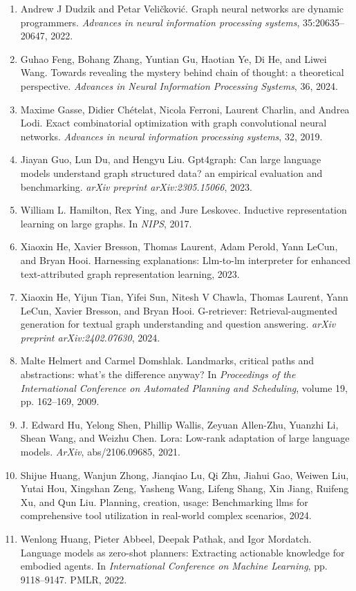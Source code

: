 \documentclass[11pt,UTF8,fontset=fandol]{ctexart}
\begin{document}
\begin{enumerate}[leftmargin=2em]
\item Andrew J Dudzik and Petar Veli\v{c}kovi\'c. Graph neural networks are dynamic programmers. \textit{Advances in neural information processing systems}, 35:20635--20647, 2022.
\item Guhao Feng, Bohang Zhang, Yuntian Gu, Haotian Ye, Di He, and Liwei Wang. Towards revealing the mystery behind chain of thought: a theoretical perspective. \textit{Advances in Neural Information Processing Systems}, 36, 2024.
\item Maxime Gasse, Didier Ch\'etelat, Nicola Ferroni, Laurent Charlin, and Andrea Lodi. Exact combinatorial optimization with graph convolutional neural networks. \textit{Advances in neural information processing systems}, 32, 2019.
\item Jiayan Guo, Lun Du, and Hengyu Liu. Gpt4graph: Can large language models understand graph structured data? an empirical evaluation and benchmarking. \textit{arXiv preprint arXiv:2305.15066}, 2023.
\item William L. Hamilton, Rex Ying, and Jure Leskovec. Inductive representation learning on large graphs. In \textit{NIPS}, 2017.
\item Xiaoxin He, Xavier Bresson, Thomas Laurent, Adam Perold, Yann LeCun, and Bryan Hooi. Harnessing explanations: Llm-to-lm interpreter for enhanced text-attributed graph representation learning, 2023.
\item Xiaoxin He, Yijun Tian, Yifei Sun, Nitesh V Chawla, Thomas Laurent, Yann LeCun, Xavier Bresson, and Bryan Hooi. G-retriever: Retrieval-augmented generation for textual graph understanding and question answering. \textit{arXiv preprint arXiv:2402.07630}, 2024.
\item Malte Helmert and Carmel Domshlak. Landmarks, critical paths and abstractions: what's the difference anyway? In \textit{Proceedings of the International Conference on Automated Planning and Scheduling}, volume 19, pp. 162--169, 2009.
\item J. Edward Hu, Yelong Shen, Phillip Wallis, Zeyuan Allen-Zhu, Yuanzhi Li, Shean Wang, and Weizhu Chen. Lora: Low-rank adaptation of large language models. \textit{ArXiv}, abs/2106.09685, 2021.
\item Shijue Huang, Wanjun Zhong, Jianqiao Lu, Qi Zhu, Jiahui Gao, Weiwen Liu, Yutai Hou, Xingshan Zeng, Yasheng Wang, Lifeng Shang, Xin Jiang, Ruifeng Xu, and Qun Liu. Planning, creation, usage: Benchmarking llms for comprehensive tool utilization in real-world complex scenarios, 2024.
\item Wenlong Huang, Pieter Abbeel, Deepak Pathak, and Igor Mordatch. Language models as zero-shot planners: Extracting actionable knowledge for embodied agents. In \textit{International Conference on Machine Learning}, pp. 9118--9147. PMLR, 2022.

\end{enumerate}
\end{document}

